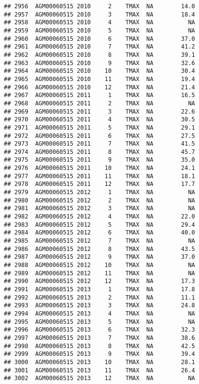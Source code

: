 \documentclass{article}\usepackage[]{graphicx}\usepackage[]{color}
\makeatletter
\newenvironment{kframe}{%
 \def\at@end@of@kframe{}%
 \ifinner\ifhmode%
  \def\at@end@of@kframe{\end{minipage}}%
  \begin{minipage}{\columnwidth}%
 \fi\fi%
 \def\FrameCommand##1{\hskip\@totalleftmargin \hskip-\fboxsep
 \colorbox{shadecolor}{##1}\hskip-\fboxsep
     \hskip-\linewidth \hskip-\@totalleftmargin \hskip\columnwidth}%
 \MakeFramed {\advance\hsize-\width
   \@totalleftmargin\z@ \linewidth\hsize
   \@setminipage}}%
 {\par\unskip\endMakeFramed%
 \at@end@of@kframe}
\newenvironment{knitrout}{}{} %
\makeatother
\begin{document}
\begin{knitrout}
\begin{kframe}
\begin{verbatim}
## 2956  AGM00060515 2010     2    TMAX  NA        14.0
## 2957  AGM00060515 2010     3    TMAX  NA        18.4
## 2958  AGM00060515 2010     4    TMAX  NA          NA
## 2959  AGM00060515 2010     5    TMAX  NA          NA
## 2960  AGM00060515 2010     6    TMAX  NA        37.0
## 2961  AGM00060515 2010     7    TMAX  NA        41.2
## 2962  AGM00060515 2010     8    TMAX  NA        39.1
## 2963  AGM00060515 2010     9    TMAX  NA        32.6
## 2964  AGM00060515 2010    10    TMAX  NA        30.4
## 2965  AGM00060515 2010    11    TMAX  NA        19.4
## 2966  AGM00060515 2010    12    TMAX  NA        21.4
## 2967  AGM00060515 2011     1    TMAX  NA        16.5
## 2968  AGM00060515 2011     2    TMAX  NA          NA
## 2969  AGM00060515 2011     3    TMAX  NA        22.6
## 2970  AGM00060515 2011     4    TMAX  NA        30.5
## 2971  AGM00060515 2011     5    TMAX  NA        29.1
## 2972  AGM00060515 2011     6    TMAX  NA        27.5
## 2973  AGM00060515 2011     7    TMAX  NA        41.5
## 2974  AGM00060515 2011     8    TMAX  NA        45.7
## 2975  AGM00060515 2011     9    TMAX  NA        35.0
## 2976  AGM00060515 2011    10    TMAX  NA        24.1
## 2977  AGM00060515 2011    11    TMAX  NA        18.1
## 2978  AGM00060515 2011    12    TMAX  NA        17.7
## 2979  AGM00060515 2012     1    TMAX  NA          NA
## 2980  AGM00060515 2012     2    TMAX  NA          NA
## 2981  AGM00060515 2012     3    TMAX  NA          NA
## 2982  AGM00060515 2012     4    TMAX  NA        22.0
## 2983  AGM00060515 2012     5    TMAX  NA        29.4
## 2984  AGM00060515 2012     6    TMAX  NA        40.0
## 2985  AGM00060515 2012     7    TMAX  NA          NA
## 2986  AGM00060515 2012     8    TMAX  NA        43.5
## 2987  AGM00060515 2012     9    TMAX  NA        37.0
## 2988  AGM00060515 2012    10    TMAX  NA          NA
## 2989  AGM00060515 2012    11    TMAX  NA          NA
## 2990  AGM00060515 2012    12    TMAX  NA        17.3
## 2991  AGM00060515 2013     1    TMAX  NA        17.8
## 2992  AGM00060515 2013     2    TMAX  NA        11.1
## 2993  AGM00060515 2013     3    TMAX  NA        24.8
## 2994  AGM00060515 2013     4    TMAX  NA          NA
## 2995  AGM00060515 2013     5    TMAX  NA          NA
## 2996  AGM00060515 2013     6    TMAX  NA        32.3
## 2997  AGM00060515 2013     7    TMAX  NA        38.6
## 2998  AGM00060515 2013     8    TMAX  NA        42.5
## 2999  AGM00060515 2013     9    TMAX  NA        39.4
## 3000  AGM00060515 2013    10    TMAX  NA        28.1
## 3001  AGM00060515 2013    11    TMAX  NA        26.4
## 3002  AGM00060515 2013    12    TMAX  NA          NA

\end{verbatim}
\end{kframe}
\end{knitrout}
\end{document}
